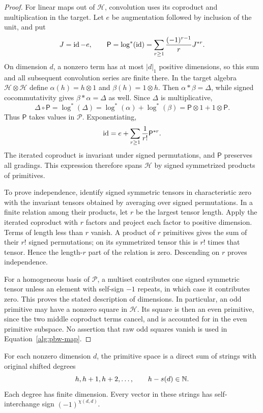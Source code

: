 \begin{proof}
For linear maps out of $\mathcal H$, convolution uses its coproduct
and multiplication in the target.  Let $e$ be augmentation followed
by inclusion of the unit, and put
\[
 J=\operatorname{id}-e,\qquad
 \mathsf P=\log^*(\operatorname{id})=
      \sum_{r\ge1}\frac{(-1)^{r-1}}rJ^{*r}.
\]
On dimension $d$, a nonzero term has at most $|d|_1$ positive
dimensions, so this sum and all subsequent convolution series are
finite there.  In the target algebra $\mathcal H\otimes\mathcal H$ define
$\alpha(h)=h\otimes1$ and $\beta(h)=1\otimes h$.
Then $\alpha*\beta=\Delta$, while signed cocommutativity gives
$\beta*\alpha=\Delta$ as well.  Since $\Delta$ is multiplicative,
\[
 \Delta\circ\mathsf P
   =\log^*(\Delta)
   =\log^*(\alpha)+\log^*(\beta)
   =\mathsf P\otimes1+1\otimes\mathsf P.
\]
Thus $\mathsf P$ takes values in $\mathcal P$.  Exponentiating,
\[
 \operatorname{id}=e+\sum_{r\ge1}\frac1{r!}\mathsf P^{*r}.
\]
The iterated coproduct is invariant under signed permutations, and
$\mathsf P$ preserves all gradings.  This expression therefore
spans $\mathcal H$ by signed symmetrized products of primitives.

To prove independence, identify signed symmetric tensors in
characteristic zero with the invariant tensors obtained by averaging
over signed permutations.  In a finite relation among their
products, let $r$ be the largest tensor length.  Apply the iterated
coproduct with $r$ factors and project each factor to positive
dimension.  Terms of length less than $r$ vanish.  A product of $r$
primitives gives the sum of their $r!$ signed permutations; on its
symmetrized tensor this is $r!$ times that tensor.  Hence the
length-$r$ part of the relation is zero.  Descending on $r$ proves
independence.

For a homogeneous basis of $\mathcal P$, a multiset contributes one
signed symmetric tensor unless an element with self-sign $-1$
repeats, in which case it contributes zero.  This proves the stated
description of dimensions.  In particular, an odd primitive may have
a nonzero square in $\mathcal H$.  Its square is then an even
primitive, since the two middle coproduct terms cancel, and is
accounted for in the even primitive subspace.  No assertion that raw odd
squares vanish is used in Equation~\eqref{alg:pbw-map}.
\end{proof}

\begin{lemma}\label{alg:strings}
For each nonzero dimension $d$, the primitive space is a direct sum
of strings with original shifted degrees
\[
 h,h+1,h+2,\ldots,
 \qquad h-s(d)\in\mathbb N.
\]
Each degree has finite dimension.  Every vector in these strings has
self-interchange sign $(-1)^{\chi(d,d)}$.
\end{lemma}

